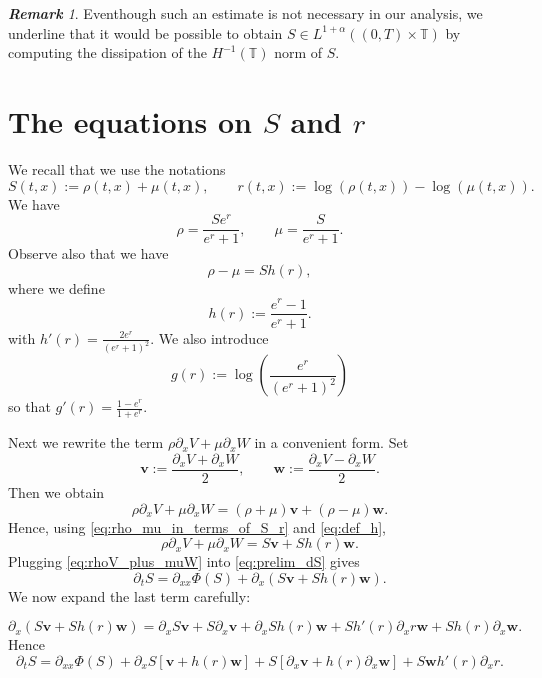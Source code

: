 \documentclass[a4paper,twosided, 11pt]{article}
\newcommand {\T}  { {\mathbb{T}} }
\newcommand*{\vv}{\mathbf{v}}
\newcommand*{\ww}{\mathbf{w}}
\theoremstyle{plain}
\theoremstyle{remark}
\newtheorem{remark}[thm]{\bf Remark}
\numberwithin{equation}{section}
\begin{document}
\begin{remark}
Eventhough such an estimate is not necessary in our analysis, we underline that it would be possible to obtain $S\in L^{1+\alpha}((0,T)\times \T)$ by computing the dissipation of the $H^{-1}(\T)$ norm of $S$.
\end{remark}

\section{The equations on $S$ and $r$}
We recall that we use the notations
$$
S(t,x) := \rho(t,x) + \mu(t,x), 
\qquad
r(t,x) := \log \left(\rho(t,x) \right) - \log \left(\mu(t,x) \right).
$$
We have
\begin{equation}\label{eq:rho_mu_in_terms_of_S_r}
\rho  = \frac{Se^r}{e^r+1},
\qquad
\mu  = \frac{S}{e^r+1}.
\end{equation}
Observe also that we have
$$
\rho-\mu = Sh(r), 
$$
where we define
\begin{equation}\label{eq:def_h}
h(r) := \frac{e^r-1}{e^r+1}. 
\end{equation}
with $h'(r)  
 = \frac{2e^r}{(e^r+1)^2}$. We also introduce
\begin{equation}\label{eq:def_g}
g(r) := \log \left(\frac{e^r}{(e^r+1)^2} \right) 
\end{equation}
so that $g'(r)  = \frac{1-e^r}{1+e^r}$.  




Next we rewrite the term $\rho\partial_x V + \mu\partial_x W$ in a convenient form.  Set
\begin{equation}\label{eq:def_alpha_beta}
\vv  := \frac{\partial_x V+ \partial_x W}{2},
\qquad
\ww  := \frac{\partial_x V- \partial_x W}{2}.
\end{equation}
Then we obtain
$$
\rho\partial_x V + \mu\partial_x W
 =   \left(\rho+\mu \right) \vv
 +  \left(\rho-\mu \right) \ww. 
$$
Hence, using \eqref{eq:rho_mu_in_terms_of_S_r} and \eqref{eq:def_h},
\begin{equation}\label{eq:rhoV_plus_muW}
\rho\partial_x V + \mu\partial_x W
 =  S\vv  +  Sh(r)\ww.
\end{equation}
Plugging \eqref{eq:rhoV_plus_muW} into \eqref{eq:prelim_dS} gives
$$
\partial_t S 
 =  \partial_{xx} \Phi(S)
 + \partial_x \left(S\vv + Sh(r)\ww \right).
$$
We now expand the last term carefully:

$$
\partial_x \left(S\vv + Sh(r)\ww \right)
= \partial_x S\vv  + S\partial_x\vv
 + \partial_x S h(r)\ww + Sh'(r)\partial_x r\ww
 + Sh(r)\partial_x\ww.
$$
Hence
\begin{equation}\label{eq:dS_final}
\partial_t S
=\partial_{xx} \Phi(S)
 + \partial_x S \left[\vv + h(r)\ww \right]
 + S \left[\partial_x\vv + h(r)\partial_x\ww \right]
 + S\ww h'(r)\partial_x r.
\end{equation}
\bigskip
\end{document}
